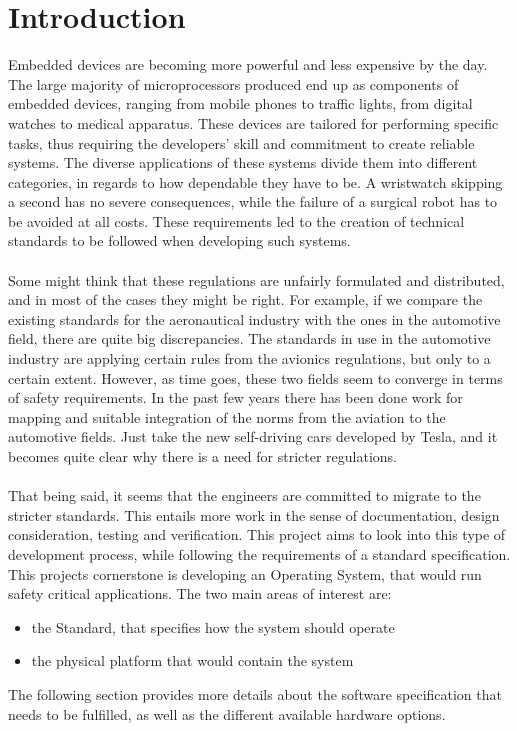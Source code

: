 \chapter{Introduction}\label{ch:introduction} 

Embedded devices are becoming more powerful and less expensive by the day. The large majority of
microprocessors produced end up as components of embedded devices, ranging from mobile phones
to traffic lights, from digital watches to medical apparatus. These devices are tailored for 
performing specific tasks, thus requiring the developers' skill and commitment to create reliable
systems. The diverse applications of these systems divide them into different categories, in regards to
how dependable they have to be. A wristwatch skipping a second has no severe consequences, while the
failure of a surgical robot has to be avoided at all costs. These requirements led to the creation 
of technical standards to be followed when developing such systems. 
\\\\
Some might think that these regulations are unfairly formulated and distributed, and in most
of the cases they might be right. For example, if we compare the existing standards for the aeronautical industry with the ones in the automotive field, there are quite big discrepancies. The standards 
in use in the automotive industry are applying certain rules from the avionics regulations, 
but only to a certain extent.
However, as time goes, these two fields seem to converge in terms of safety requirements. 
In the past few years there has been done work for mapping and suitable integration 
of the norms from the aviation to the automotive fields. Just take the new self-driving 
cars developed by Tesla, and it becomes quite clear why there is a need for stricter regulations. 
\\\\
That being said, it seems that the engineers are committed to migrate to the stricter standards. 
This entails more work in the sense of documentation, design consideration, testing and verification.
This project aims to look into this type of development process, while following the requirements 
of a standard specification.
This project\textquotesingle s cornerstone is developing an Operating System, that would run safety critical 
applications. The two main areas of interest are:
\begin{itemize}
\item the Standard, that specifies how the system should operate
\item the physical platform that would contain the system
\end{itemize}
The following section provides more details about the software specification that needs to be fulfilled,
as well as the different available hardware options.